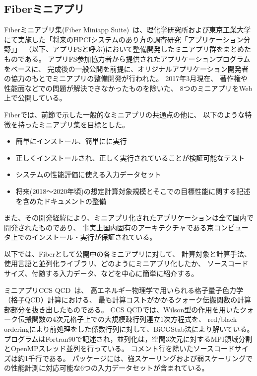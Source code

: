 \subsection{Fiberミニアプリ}
Fiberミニアプリ集(Fiber Miniapp Suite)~\cite{Fiber}は、理化学研究所および東京工業大学にて実施した「将来のHPCIシステムのあり方の調査研究「アプリケーション分野」」~\cite{ApliFS}（以下、アプリFSと呼ぶ)において整備開発したミニアプリ群をまとめたものである。
アプリFS参加協力者から提供されたアプリケーションプログラムをベースに、
完成後の一般公開を前提に、オリジナルアプリケーション開発者の協力のもとでミニアプリの整備開発が行われた。
2017年3月現在、
著作権や性能面などでの問題が解決できなかったものを除いた、
8つのミニアプリをWeb上で公開している。

Fiberでは、前節で示した一般的なミニアプリの共通点の他に、
以下のような特徴を持ったミニアプリ集を目標とした。

\begin{itemize}
\item 簡単にインストール、簡単にに実行
\item 正しくインストールされ、正しく実行されていることが検証可能なテスト
\item システムの性能評価に使える入力データセット
\item 将来(2018〜2020年頃)の想定計算対象規模とそこでの目標性能に関する記述を含めたドキュメントの整備
\end{itemize}

また、その開発経緯により、ミニアプリ化されたアプリケーションは全て国内で開発されたものであり、
事実上国内固有のアーキテクチャである京コンピュータ上でのインストール・実行が保証されている。

以下では、Fiberとして公開中の各ミニアプリに対して、
計算対象と計算手法、使用言語と並列化ライブラリ、どのようにミニアプリ化したか、
ソースコードサイズ、付随する入力データ、などを中心に簡単に紹介する。

ミニアプリCCS QCD~\cite{CCS-QCD_boku2012,CCS-QCD_terai2013}は、
高エネルギー物理学で用いられる格子量子色力学（格子QCD）計算における、
最も計算コストがかかるクォーク伝搬関数の計算部部分を抜き出したものである。
CCS QCDでは、Wilson型の作用を用いたクォーク伝搬関数の4次元格子上での大規模疎行列連立1次方程式を、
red/black orderingにより前処理をした係数行列に対して、BiCGStab法により解いている。
プログラムはFortran90で記述され，並列化は，空間3次元に対するMPI領域分割とOpenMPスレッド並列を行っている。
コメント行を除いたソースコードサイズは約1千行である。
パッケージには、強スケーリングおよび弱スケーリングでの性能計測に対応可能な6つの入力データセットが含まれている。


